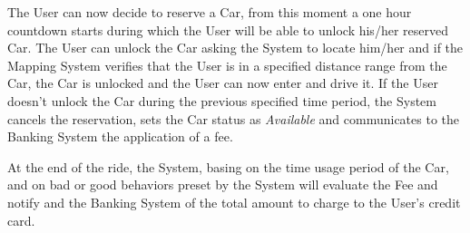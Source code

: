 The User can now decide to reserve a Car, from this moment a one hour countdown starts during which the User will be able to unlock his/her reserved Car.
The User can unlock the Car asking the System to locate him/her and if the Mapping System verifies that the User is in a specified distance range from the Car, the Car is unlocked and the User can now enter and drive it. If the User doesn't unlock the Car during the previous specified time period, the System cancels the reservation, sets the Car status as \textit{Available} and communicates to the Banking System the application of a fee.
\smallskip


At the end of the ride, the System, basing on the time usage period of the Car, and on bad or good behaviors preset by the System will evaluate the Fee and notify and the Banking System of the total amount to charge to the User's credit card.




